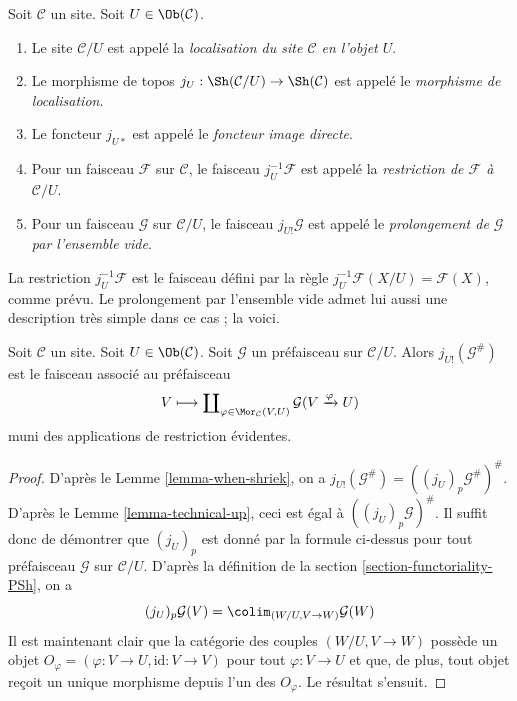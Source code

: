\begin{definition}
\label{definition-localize}
Soit $\mathcal{C}$ un site.
Soit $U \in \Ob(\mathcal{C})$.
\begin{enumerate}
\item Le site $\mathcal{C}/U$ est appelé la {\it localisation du site
$\mathcal{C}$ en l’objet $U$}.
\item Le morphisme de topos
$j_U : \Sh(\mathcal{C}/U) \to \Sh(\mathcal{C})$
est appelé le {\it morphisme de localisation}.
\item Le foncteur $j_{U*}$ est appelé le {\it foncteur image directe}.
\item Pour un faisceau $\mathcal{F}$ sur $\mathcal{C}$, le faisceau
$j_U^{-1}\mathcal{F}$ est appelé la {\it restriction de $\mathcal{F}$
à $\mathcal{C}/U$}.
\item Pour un faisceau $\mathcal{G}$ sur $\mathcal{C}/U$, le faisceau
$j_{U!}\mathcal{G}$ est appelé le
{\it prolongement de $\mathcal{G}$ par l’ensemble vide}.
\end{enumerate}
\end{definition}

\noindent
La restriction $j_U^{-1}\mathcal{F}$ est le faisceau défini par la règle
$j_U^{-1}\mathcal{F}(X/U) = \mathcal{F}(X)$, comme prévu.
Le prolongement par l’ensemble vide admet lui aussi une description très simple
dans ce cas ; la voici.

\begin{lemma}
\label{lemma-describe-j-shriek}
Soit $\mathcal{C}$ un site.
Soit $U \in \Ob(\mathcal{C})$.
Soit $\mathcal{G}$ un préfaisceau sur $\mathcal{C}/U$.
Alors $j_{U!}(\mathcal{G}^\#)$ est le faisceau associé au préfaisceau
$$
V
\longmapsto
\coprod\nolimits_{\varphi \in \Mor_\mathcal{C}(V, U)}
\mathcal{G}(V \xrightarrow{\varphi} U)
$$
muni des applications de restriction évidentes.
\end{lemma}

\begin{proof}
D’après le Lemme \ref{lemma-when-shriek}, on a
$j_{U!}(\mathcal{G}^\#) = ((j_U)_p\mathcal{G}^\#)^\#$.
D’après le Lemme \ref{lemma-technical-up}, ceci est égal à
$((j_U)_p\mathcal{G})^\#$.
Il suffit donc de démontrer que $(j_U)_p$ est donné par la formule ci-dessus
pour tout préfaisceau $\mathcal{G}$ sur $\mathcal{C}/U$.
D’après la définition de la
section \ref{section-functoriality-PSh}, on a
$$
(j_U)_p\mathcal{G}(V)
=
\colim_{(W/U, V \to W)} \mathcal{G}(W)
$$
Il est maintenant clair que la catégorie des couples $(W/U, V \to W)$
possède un objet $O_\varphi = (\varphi : V \to U, \text{id} : V \to V)$
pour tout $\varphi : V \to U$ et que, de plus, tout objet reçoit un unique
morphisme depuis l’un des $O_\varphi$. Le résultat s’ensuit.
\end{proof}

